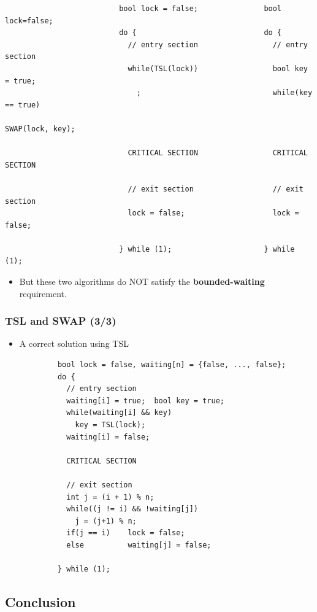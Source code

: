 \documentclass[CJKutf8,xcolor=pdftex,dvipsnames,table]{beamer}
\begin{document}
\begin{CJK*}{UTF8}{song}
\begin{frame}[fragile]
\begin{lstlisting}
						  bool lock = false;               bool lock=false;
						  do {                             do {
						    // entry section                 // entry section
						    while(TSL(lock))                 bool key = true;
						      ;                              while(key == true)
						                                       SWAP(lock, key);

						    CRITICAL SECTION                 CRITICAL SECTION

						    // exit section                  // exit section
						    lock = false;                    lock = false;

						  } while (1);                     } while (1);
\end{lstlisting}

  \pause

  \begin{itemize}
  \item{But these two algorithms do NOT satisfy the \textbf{bounded-waiting} requirement.}
  \end{itemize}
\end{frame}

  \begin{frame}[fragile]
  \frametitle{TSL and SWAP (3/3)} \pause
  \begin{itemize}
  \item{A correct solution using TSL} \pause
  \end{itemize}

\begin{lstlisting}
            bool lock = false, waiting[n] = {false, ..., false};
            do {
              // entry section
              waiting[i] = true;  bool key = true;
              while(waiting[i] && key)
                key = TSL(lock);
              waiting[i] = false;

              CRITICAL SECTION

              // exit section
              int j = (i + 1) % n;
              while((j != i) && !waiting[j])
                j = (j+1) % n;
              if(j == i)    lock = false;
              else          waiting[j] = false;

            } while (1);
\end{lstlisting}

\end{frame}

\subsection{Conclusion}


\end{CJK*}
\end{document}
